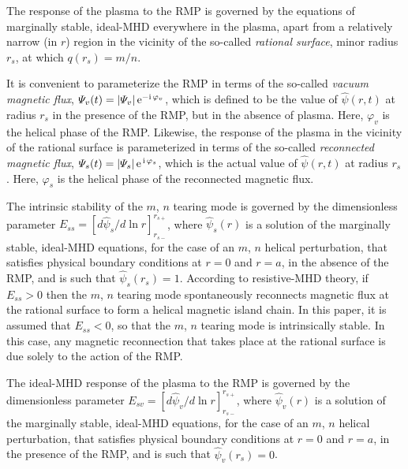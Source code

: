 \documentclass[12pt,prb,aps]{revtex4-1}
\begin{document}
The response of the plasma to the RMP is governed by the equations of marginally stable, ideal-MHD everywhere in the
plasma, apart from a relatively narrow (in $r$) region in the vicinity of the so-called {\em rational surface}, minor radius $r_s$, 
at which $q(r_s)=m/n$.\cite{rfa}

It is convenient to parameterize the RMP in terms of the so-called {\em vacuum magnetic flux}, ${\mit\Psi}_v(t) = |{\mit\Psi}_v|\,{\rm e}^{-{\rm i}\,\varphi_v}$,
which is defined to be the value of $\hat{\psi}(r,t)$ at radius $r_s$ in the presence of the RMP, but in the absence of plasma. Here,
$\varphi_v$ is the helical phase of the RMP. Likewise, the response of the plasma in the vicinity of the rational
surface is parameterized in terms of the so-called {\em reconnected magnetic flux}, ${\mit\Psi}_s(t)=|{\mit\Psi}_s|\,{\rm e}^{\,{\rm i}\,\varphi_s}$, 
which is the actual value of $\hat{\psi}(r,t)$ at radius $r_s$. Here, $\varphi_s$ is the helical phase of
the reconnected magnetic flux.

The intrinsic stability of the $m$, $n$ tearing mode is governed by the dimensionless parameter
$E_{ss}= [d\hat{\psi}_s/d\ln r]_{r_{s-}}^{r_{s+}}$, where $\hat{\psi}_s(r)$
is a solution of the marginally stable, ideal-MHD equations, for the case of an $m$, $n$ helical
perturbation, that satisfies physical boundary conditions at $r=0$ and $r=a$, in the absence of the
RMP, and is such that $\hat{\psi}_s(r_s)=1$.\cite{fkr,am1} According to resistive-MHD theory,\cite{fkr,ruth}
if $E_{ss}>0$ then the $m$, $n$ tearing mode spontaneously reconnects magnetic flux at the rational
surface to form a helical magnetic island chain. In this paper, it is assumed that $E_{ss}<0$, so that the
$m$, $n$ tearing mode is intrinsically stable. In this case, any magnetic reconnection that takes place
at the rational surface is due solely to the action of the RMP.

The ideal-MHD response of the plasma to the RMP is governed by the dimensionless parameter
$E_{sv}= [d\hat{\psi}_v/d\ln r]_{r_{s-}}^{r_{s+}}$, where $\hat{\psi}_v(r)$
is a solution of the marginally stable, ideal-MHD equations, for the case of an $m$, $n$ helical
perturbation, that satisfies physical boundary conditions at $r=0$ and $r=a$, in the presence of the
RMP, and is such that $\hat{\psi}_v(r_s)=0$.\cite{am1} 
\end{document}
